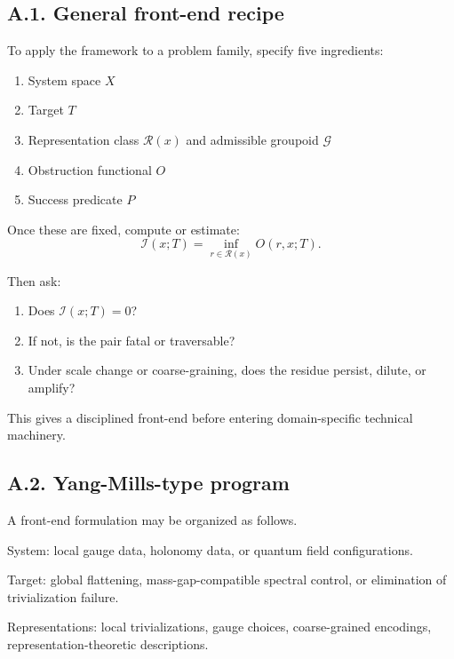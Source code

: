 \documentclass[
]{article}
\providecommand{\tightlist}{%
  \setlength{\itemsep}{0pt}\setlength{\parskip}{0pt}}
\begin{document}
\subsection{A.1. General front-end
recipe}\label{a.1.-general-front-end-recipe}

To apply the framework to a problem family, specify five ingredients:

\begin{enumerate}
\def\labelenumi{\arabic{enumi}.}
\tightlist
\item
  System space \(X\)
\item
  Target \(T\)
\item
  Representation class \(\mathcal{R}(x)\) and admissible groupoid
  \(\mathcal{G}\)
\item
  Obstruction functional \(O\)
\item
  Success predicate \(P\)
\end{enumerate}

Once these are fixed, compute or estimate: \[
\mathcal{I}(x;T) = \inf_{r \in \mathcal{R}(x)} O(r,x;T).
\]

Then ask:

\begin{enumerate}
\def\labelenumi{\arabic{enumi}.}
\tightlist
\item
  Does \(\mathcal{I}(x;T)=0\)?
\item
  If not, is the pair fatal or traversable?
\item
  Under scale change or coarse-graining, does the residue persist,
  dilute, or amplify?
\end{enumerate}

This gives a disciplined front-end before entering domain-specific
technical machinery.

\subsection{A.2. Yang-Mills-type
program}\label{a.2.-yang-mills-type-program}

A front-end formulation may be organized as follows.

System: local gauge data, holonomy data, or quantum field
configurations.

Target: global flattening, mass-gap-compatible spectral control, or
elimination of trivialization failure.

Representations: local trivializations, gauge choices, coarse-grained
encodings, representation-theoretic descriptions.
\end{document}

